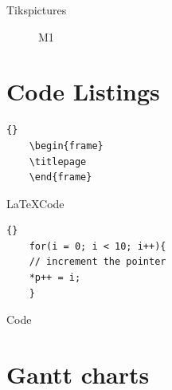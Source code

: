 \documentclass{beamer}
\begin{document}
\begin{frame}{Tikspictures}
\begin{figure}
\caption{M1} \label{fig:M1}
\end{figure}
\end{frame}





\section{Code Listings}

\lstset{language=[LaTeX]tex}
\lstset{caption=Some \LaTeX Code}
\begin{lrbox}{\codebox}
	\begin{lstlisting}[frame=single]{}
	\begin{frame}
	\titlepage
	\end{frame}
	\end{lstlisting}
\end{lrbox}
\begin{frame}{\LaTeX Code}
	\usebox{\codebox}
\end{frame}



\lstset{language=c++}
\lstset{caption=Some C++ Code}
\begin{lrbox}{\codebox}
	\begin{lstlisting}[frame=single, basicstyle=\ttfamily]{}
	for(i = 0; i < 10; i++){
	// increment the pointer
	*p++ = i;
	}
	\end{lstlisting}
\end{lrbox}
\begin{frame}{Code}
	\usebox{\codebox}
\end{frame}

\section{Gantt charts}
\end{document}
